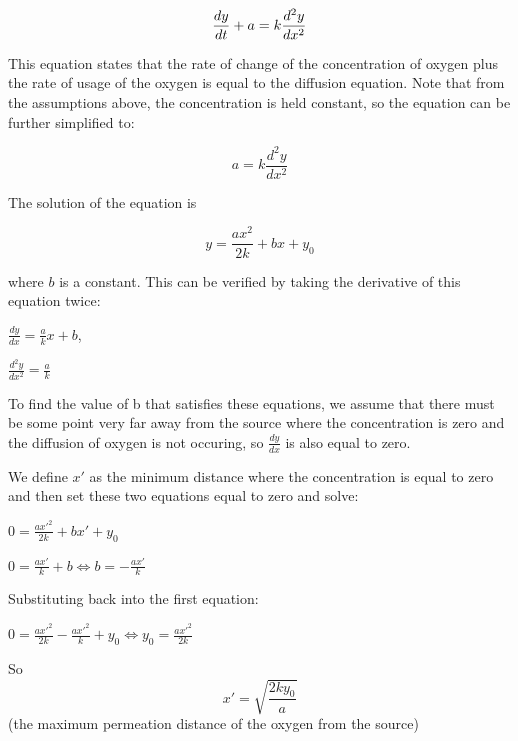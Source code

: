 \documentclass{article}
\begin{document}
\begin{equation}
    \frac{dy}{dt} + a = k \* \frac{d^2y}{dx^2}
\end{equation}

This equation states that the rate of change of the concentration of oxygen plus the rate of usage of the oxygen is equal to the diffusion equation.
Note that from the assumptions above, the concentration is held constant, so the equation can be further simplified to:

\begin{equation}
    a = k \frac{d^2y}{dx^2}
    \label{eq:oxygen}
\end{equation}

The solution of the equation is

\begin{equation}
    y = \frac{ax^2}{2k} + bx + y_0
\end{equation}

where $b$ is a constant.
This can be verified by taking the derivative of this equation twice:

$ \frac{dy}{dx} = \frac{a}{k}x + b$,

\vspace*{0.25cm}

$ \frac{d^2y}{dx^2} = \frac{a}{k}$
\vspace*{0.25cm}

To find the value of b that satisfies these equations, we assume that there must be some point
very far away from the source where the concentration is zero and the diffusion of oxygen is not occuring,
so $\frac{dy}{dx}$ is also equal to zero.


We define $x'$ as the minimum distance where the concentration is equal to zero and then set these two equations equal to zero and solve:

\vspace*{0.25cm}
$ 0 = \frac{a{x'}^2}{2k} + bx' + y_0 $
\vspace*{0.25cm}

$ 0 = \frac{ax'}{k} + b \Leftrightarrow b = -\frac{ax'}{k}$
\vspace*{0.5cm}

Substituting back into the first equation:
\vspace*{0.5cm}

$ 0 = \frac{a{x'}^2}{2k} - \frac{a{x'}^2}{k} + y_0 \Leftrightarrow y_0 = \frac{a{x'}^2}{2k}$

So
\begin{equation}
    x' = \sqrt{\frac{2ky_0}{a}}
\end{equation}
(the maximum permeation distance of the oxygen from the source)
\end{document}
